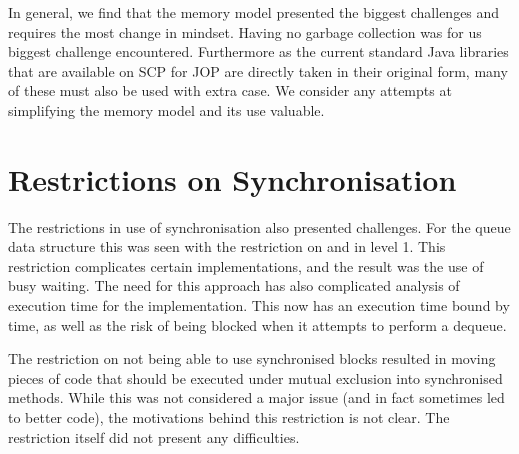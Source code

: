 In general, we find that the memory model presented the biggest challenges and requires the most change in mindset. Having no garbage collection was for us biggest challenge encountered. Furthermore as the current standard Java libraries that are available on SCP for JOP are directly taken in their original form, many of these must also be used with extra case. We consider any attempts at simplifying the memory model and its use valuable.

 \section{Restrictions on Synchronisation} %
 \label{sec:restrictions_on_synchronisation}
The restrictions in use of synchronisation also presented challenges. For the queue data structure this was seen with the restriction on  and  in level 1. This restriction complicates certain implementations, and the result was the use of busy waiting. The need for this approach has also complicated analysis of execution time for the implementation. This now has an execution time bound by time, as well as the risk of being blocked when it attempts to perform a dequeue.

The restriction on not being able to use synchronised blocks resulted in moving pieces of code that should be executed under mutual exclusion into synchronised methods. While this was not considered a major issue (and in fact sometimes led to better code), the motivations behind this restriction is not clear. The restriction itself did not present any difficulties.
